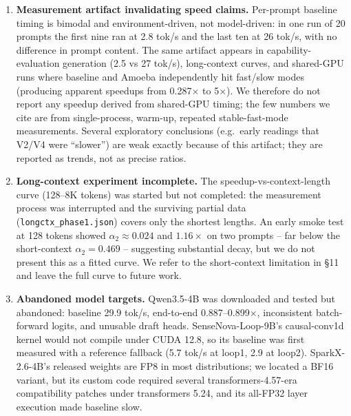 \documentclass[11pt,a4paper]{article}
\begin{document}
\begin{enumerate}[leftmargin=*]
        (\texttt{ones\_total}, \texttt{ones\_new}, \texttt{none}); explicit position ids; fp32 lm-head
        readout; and changing attention implementation (eager vs sdpa). None changed the per-layer
        hidden divergence (0.125 at layer 0, accumulating to 0.75 by layer 41). Single-token
        verification restored exact agreement (96/96) but was 3.7$\times$ slower. The divergence is
        in the batched matmul itself, not in masking or position encoding.
  \item \textbf{Measurement artifact invalidating speed claims.} Per-prompt baseline timing is
        bimodal and environment-driven, not model-driven: in one run of 20 prompts the first nine
        ran at 2.8 tok/s and the last ten at 26 tok/s, with no difference in prompt content. The
        same artifact appears in capability-evaluation generation (2.5 vs 27 tok/s),
        long-context curves, and shared-GPU runs where baseline and Amoeba independently hit
        fast/slow modes (producing apparent speedups from 0.287$\times$ to 5$\times$). We therefore
        do not report any speedup derived from shared-GPU timing; the few numbers we cite are from
        single-process, warm-up, repeated stable-fast-mode measurements. Several exploratory
        conclusions (e.g.\ early readings that V2/V4 were ``slower'') are weak exactly because of
        this artifact; they are reported as trends, not as precise ratios.
  \item \textbf{Long-context experiment incomplete.} The speedup-vs-context-length curve (128--8K
        tokens) was started but not completed: the measurement process was interrupted and the
        surviving partial data (\texttt{longctx\_phase1.json}) covers only the shortest lengths.
        An early smoke test at 128 tokens showed $\alpha_2\approx0.024$ and $1.16\times$ on two
        prompts -- far below the short-context $\alpha_2=0.469$ -- suggesting substantial decay,
        but we do not present this as a fitted curve. We refer to the short-context limitation in
        \S11 and leave the full curve to future work.
  \item \textbf{Abandoned model targets.} Qwen3.5-4B was downloaded and tested but abandoned:
        baseline 29.9 tok/s, end-to-end 0.887--0.899$\times$, inconsistent batch-forward logits,
        and unusable draft heads. SenseNova-Loop-9B's causal-conv1d kernel would not compile under
        CUDA 12.8, so its baseline was first measured with a reference fallback (5.7 tok/s at loop1,
        2.9 at loop2). SparkX-2.6-4B's released weights are FP8 in most distributions; we located
        a BF16 variant, but its custom code required several transformers-4.57-era compatibility
        patches under transformers 5.24, and its all-FP32 layer execution made baseline slow.
\end{enumerate}
\end{document}
